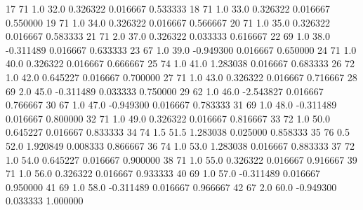 \documentclass[letterpaper,10pt,english]{sphinxmanual}
\begin{document}
{\begin{sphinxVerbatim}[commandchars=\\\{\}]
17          71       1.0   32.0         0.326322       0.016667    0.533333
18          71       1.0   33.0         0.326322       0.016667    0.550000
19          71       1.0   34.0         0.326322       0.016667    0.566667
20          71       1.0   35.0         0.326322       0.016667    0.583333
21          71       2.0   37.0         0.326322       0.033333    0.616667
22          69       1.0   38.0        -0.311489       0.016667    0.633333
23          67       1.0   39.0        -0.949300       0.016667    0.650000
24          71       1.0   40.0         0.326322       0.016667    0.666667
25          74       1.0   41.0         1.283038       0.016667    0.683333
26          72       1.0   42.0         0.645227       0.016667    0.700000
27          71       1.0   43.0         0.326322       0.016667    0.716667
28          69       2.0   45.0        -0.311489       0.033333    0.750000
29          62       1.0   46.0        -2.543827       0.016667    0.766667
30          67       1.0   47.0        -0.949300       0.016667    0.783333
31          69       1.0   48.0        -0.311489       0.016667    0.800000
32          71       1.0   49.0         0.326322       0.016667    0.816667
33          72       1.0   50.0         0.645227       0.016667    0.833333
34          74       1.5   51.5         1.283038       0.025000    0.858333
35          76       0.5   52.0         1.920849       0.008333    0.866667
36          74       1.0   53.0         1.283038       0.016667    0.883333
37          72       1.0   54.0         0.645227       0.016667    0.900000
38          71       1.0   55.0         0.326322       0.016667    0.916667
39          71       1.0   56.0         0.326322       0.016667    0.933333
40          69       1.0   57.0        -0.311489       0.016667    0.950000
41          69       1.0   58.0        -0.311489       0.016667    0.966667
42          67       2.0   60.0        -0.949300       0.033333    1.000000
\end{sphinxVerbatim}
}

{
\begin{sphinxVerbatim}[commandchars=\\\{\}]
\llap{\color{nbsphinxin}[252]:\,\hspace{\fboxrule}\hspace{\fboxsep}}   
  
\end{sphinxVerbatim}
}
\end{document}
